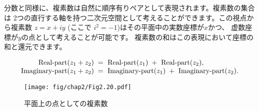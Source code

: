 分数と同様に、複素数は自然に順序有りペアとして表現されます。複素数の集合は
2つの直行する軸を持つ二次元空間として考えることができます。この視点から複素数
\( z = x + iy \) (ここで \( i^2 = -1 \))はその平面中の実数座標が\( x \)かつ、
虚数座標が\( y \)の点として考えることが可能です。
複素数の和はこの表現において座標の和と還元できます。
\begin{comment}

\begin{example}
Real-part(z_1 + z_2) = Real-part(z_1) + Real-part(z_2)

Imaginary-part(z_1 + z_2) = Imaginary-part(z_1) + Imaginary-part(z_2)
\end{example}

\end{comment}
\begin{displaymath}
\begin{array}{r@{{}={}}l}
  \hbox{Real-part} (z_1 + z_2)\; 	& 
	\hbox{ Real-part} (z_1)\; + \hbox{ Real-part} (z_2), \\
  \hbox{Imaginary-part} (z_1 + z_2)\; 	& 
	\hbox{ Imaginary-part} (z_1)\; + \hbox{ Imaginary-part} (z_2). 
\end{array}
\end{displaymath}

\begin{figure}[tb]
\label{Figure 2.20}
\centering
\begin{comment}
\heading{Figure 2.20:} Complex numbers as points in the plane.

\begin{example}
 Imaginary
    ^
    |
  y |.........................* z = x + ?y = r e^(?A)
    |                    __-- .
    |                __--     .
    |          r __--         .
    |        __--             .
    |    __-- \               .
    |__--    A |              .
----+----------+-------------------> Real
                              x
\end{example}
\end{comment}
\texttt{[image: fig/chap2/Fig2.20.pdf]}
\par\bigskip
\noindent
{} 平面上の点としての複素数
\end{figure}

